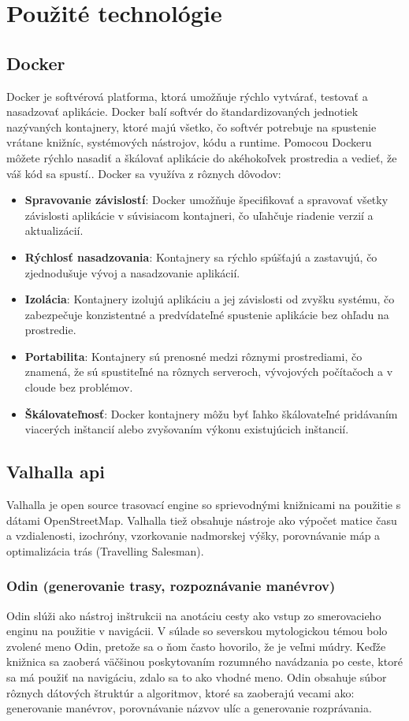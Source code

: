 \section{Použité technológie}
\subsection{Docker}
Docker je softvérová platforma, ktorá umožňuje rýchlo vytvárať, testovať a nasadzovať aplikácie. Docker balí softvér do štandardizovaných jednotiek nazývaných kontajnery, ktoré majú všetko, čo softvér potrebuje na spustenie vrátane knižníc, systémových nástrojov, kódu a runtime. Pomocou Dockeru môžete rýchlo nasadiť a škálovať aplikácie do akéhokoľvek prostredia a vedieť, že váš kód sa spustí.\cite{docker}. Docker sa využíva z rôznych dôvodov\cite{whyDocker}: 
\begin{itemize}
    \item \textbf{Spravovanie závislostí}: Docker umožňuje špecifikovať a spravovať všetky závislosti aplikácie v súvisiacom kontajneri, čo uľahčuje riadenie verzií a aktualizácií.
    \item \textbf{Rýchlosť nasadzovania}: Kontajnery sa rýchlo spúšťajú a zastavujú, čo zjednodušuje vývoj a nasadzovanie aplikácií.
    \item \textbf{Izolácia}: Kontajnery izolujú aplikáciu a jej závislosti od zvyšku systému, čo zabezpečuje konzistentné a predvídateľné spustenie aplikácie bez ohľadu na prostredie.
    \item \textbf{Portabilita}: Kontajnery sú prenosné medzi rôznymi prostrediami, čo znamená, že sú spustiteľné na rôznych serveroch, vývojových počítačoch a v cloude bez problémov.
    \item \textbf{Škálovateľnosť}: Docker kontajnery môžu byť ľahko škálovateľné pridávaním viacerých inštancií alebo zvyšovaním výkonu existujúcich inštancií.
\end{itemize}
\subsection{Valhalla api}
Valhalla je open source trasovací engine so sprievodnými knižnicami na použitie s dátami OpenStreetMap. Valhalla tiež obsahuje nástroje ako výpočet matice času a vzdialenosti, izochróny, vzorkovanie nadmorskej výšky, porovnávanie máp a optimalizácia trás (Travelling Salesman)\cite{valhalla}.
\subsubsection{Odin (generovanie trasy, rozpoznávanie manévrov)}
Odin slúži ako nástroj inštrukcii na anotáciu cesty ako vstup zo smerovacieho enginu na použitie v navigácii. V súlade so severskou mytologickou témou bolo zvolené meno Odin, pretože sa o ňom často hovorilo, že je veľmi múdry. Keďže knižnica sa zaoberá väčšinou poskytovaním rozumného navádzania po ceste, ktoré sa má použiť na navigáciu, zdalo sa to ako vhodné meno. Odin obsahuje súbor rôznych dátových štruktúr a algoritmov, ktoré sa zaoberajú vecami ako: generovanie manévrov, porovnávanie názvov ulíc a generovanie rozprávania. \cite{odin}
